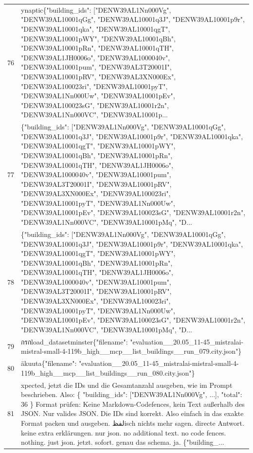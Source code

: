 \documentclass[a4paper,11pt]{article}
\begin{document}
\begin{table}[ht]
\begin{tabular}{r p{12cm}}
76 & ynaptic\{"building\_ids": ["DENW39AL1Nn000Vg", "DENW39AL10001qGg", "DENW39AL10001q3J", "DENW39AL10001p9r", "DENW39AL10001qka", "DENW39AL10001qgT", "DENW39AL10001pWY", "DENW39AL10001qBh", "DENW39AL10001pRn", "DENW39AL10001qTH", "DENW39AL1JH0006o", "DENW39AL1000040v", "DENW39AL10001pum", "DENW39AL3T20001I", "DENW39AL10001pRV", "DENW39AL3XN000Ex", "DENW39AL100023ri", "DENW39AL10001pyT", "DENW39AL1Nn000Uw", "DENW39AL10001pEv", "DENW39AL100023sG", "DENW39AL10001r2n", "DENW39AL1Nn000VC", "DENW39AL10001p... \\
77 & \{"building\_ids": ["DENW39AL1Nn000Vg", "DENW39AL10001qGg", "DENW39AL10001q3J", "DENW39AL10001p9r", "DENW39AL10001qka", "DENW39AL10001qgT", "DENW39AL10001pWY", "DENW39AL10001qBh", "DENW39AL10001pRn", "DENW39AL10001qTH", "DENW39AL1JH0006o", "DENW39AL1000040v", "DENW39AL10001pum", "DENW39AL3T20001I", "DENW39AL10001pRV", "DENW39AL3XN000Ex", "DENW39AL100023ri", "DENW39AL10001pyT", "DENW39AL1Nn000Uw", "DENW39AL10001pEv", "DENW39AL100023sG", "DENW39AL10001r2n", "DENW39AL1Nn000VC", "DENW39AL10001pMq", "D... \\
78 & \{"building\_ids": ["DENW39AL1Nn000Vg", "DENW39AL10001qGg", "DENW39AL10001q3J", "DENW39AL10001p9r", "DENW39AL10001qka", "DENW39AL10001qgT", "DENW39AL10001pWY", "DENW39AL10001qBh", "DENW39AL10001pRn", "DENW39AL10001qTH", "DENW39AL1JH0006o", "DENW39AL1000040v", "DENW39AL10001pum", "DENW39AL3T20001I", "DENW39AL10001pRV", "DENW39AL3XN000Ex", "DENW39AL100023ri", "DENW39AL10001pyT", "DENW39AL1Nn000Uw", "DENW39AL10001pEv", "DENW39AL100023sG", "DENW39AL10001r2n", "DENW39AL1Nn000VC", "DENW39AL10001pMq", "D... \\
79 &  กรกload\_datasetminster\{"filename": "evaluation\_\_20.05\_11-45\_mistralai-mistral-small-4-119b\_high\_\_mcp\_\_list\_buildings\_\_run\_079.city.json"\} \\
80 & äkuuta\{"filename": "evaluation\_\_20.05\_11-45\_mistralai-mistral-small-4-119b\_high\_\_mcp\_\_list\_buildings\_\_run\_080.city.json"\} \\
81 & xpected, jetzt die IDs und die Gesamtanzahl ausgeben, wie im Prompt beschrieben. Also:
\{
  "building\_ids": ["DENW39AL1Nn000Vg", ...],
  "total": 36
\}
Format prüfen: Keine Markdown-Codefences, kein Text außerhalb des JSON. Nur valides JSON. Die IDs sind korrekt. Also einfach in das exakte Format packen und ausgeben. لفظisch nichts mehr sagen. directe Antwort. keine extra erklärungen. nur json. no additional text. no code fences. nothing. just json. jetzt. sofort. genau das schema. ja. \{"building\_... \\

\end{tabular}
\end{table}
\end{document}
